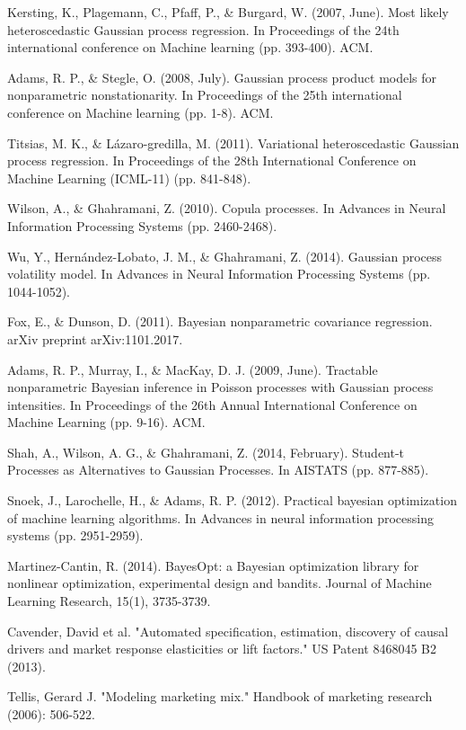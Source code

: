 \begin{thebibliography}{99}
 Kersting, K., Plagemann, C., Pfaff, P., \& Burgard, W. (2007,
June). Most likely heteroscedastic Gaussian process regression. In
Proceedings of the 24th international conference on Machine learning (pp.
393-400). ACM.

 Adams, R. P., \& Stegle, O. (2008, July). Gaussian process
product models for nonparametric nonstationarity. In Proceedings of the 25th
international conference on Machine learning (pp. 1-8). ACM.

 Titsias, M. K., \& L\'{a}zaro-gredilla, M. (2011). Variational
heteroscedastic Gaussian process regression. In Proceedings of the 28th
International Conference on Machine Learning (ICML-11) (pp. 841-848).

 Wilson, A., \& Ghahramani, Z. (2010). Copula processes. In
Advances in Neural Information Processing Systems (pp. 2460-2468).

 Wu, Y., Hern\'{a}ndez-Lobato, J. M., \& Ghahramani, Z. (2014).
Gaussian process volatility model. In Advances in Neural Information
Processing Systems (pp. 1044-1052).

 Fox, E., \& Dunson, D. (2011). Bayesian nonparametric
covariance regression. arXiv preprint arXiv:1101.2017.

 Adams, R. P., Murray, I., \& MacKay, D. J. (2009, June).
Tractable nonparametric Bayesian inference in Poisson processes with
Gaussian process intensities. In Proceedings of the 26th Annual
International Conference on Machine Learning (pp. 9-16). ACM.

 Shah, A., Wilson, A. G., \& Ghahramani, Z. (2014, February).
Student-t Processes as Alternatives to Gaussian Processes. In AISTATS (pp.
877-885).

 Snoek, J., Larochelle, H., \& Adams, R. P. (2012). Practical
bayesian optimization of machine learning algorithms. In Advances in neural
information processing systems (pp. 2951-2959).

 Martinez-Cantin, R. (2014). BayesOpt: a Bayesian optimization
library for nonlinear optimization, experimental design and bandits. Journal
of Machine Learning Research, 15(1), 3735-3739.


 {\small Cavender, David et al. "Automated
	specification, estimation, discovery of causal drivers and market response
	elasticities or lift factors." US Patent 8468045 B2 (2013).}

 {\small Tellis, Gerard J. "Modeling marketing mix."
	Handbook of marketing research (2006): 506-522.}


\end{thebibliography}

